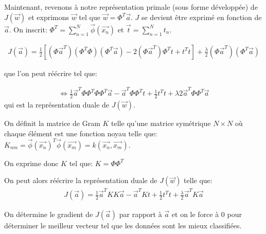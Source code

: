 Maintenant, revenons à notre représentation primale (sous forme développée) de $J(\overrightarrow{w})$ et exprimons $\overrightarrow{w}$ tel que $\overrightarrow{w} = \Phi^T \overrightarrow{a}$. 
$J$ se devient être exprimé en fonction de $\overrightarrow{a}$. On inscrit: $\Phi^T = \sum_{n=1}^N \overrightarrow{\phi}(\overrightarrow{x_n}) $ et $\overrightarrow{t} = \sum_{n=1}^Nt_n$.

\begin{equation}
\begin{split}
	J(\overrightarrow{a}) = \frac{1}{2} \left[(\Phi \overrightarrow{a}^T)(\Phi^T \Phi)(\Phi^T \overrightarrow{a}) - 2 (\Phi \overrightarrow{a}^T)\Phi^T t + t^T t \right] + \frac{\lambda}{2} (\Phi \overrightarrow{a}^T) (\Phi^T \overrightarrow{a})
\end{split}
\end{equation}

que l'on peut réécrire tel que:

\begin{equation}
\begin{split}
	\iff \frac{1}{2} \overrightarrow{a}^T \Phi \Phi^T \Phi \Phi^T \overrightarrow{a} - \overrightarrow{a}^T \Phi \Phi^T  t + \frac{1}{2} t^T t + {\lambda}{2} \overrightarrow{a}^T \Phi \Phi^T \overrightarrow{a}
\end{split}
\end{equation}
qui est la représentation duale de $J(\overrightarrow{w})$.

On définit la matrice de Gram $K$ telle qu'une matrice symétrique $N \times N$ où chaque élément est une fonction noyau telle que: $ K_{nm} = \overrightarrow{\phi} (\overrightarrow{x_n})^T \overrightarrow{\phi} (\overrightarrow{x_m}) = k(\overrightarrow{x_n}, \overrightarrow{x_m})$.

On exprime donc $K$ tel que: $K = \Phi \Phi^T$

On peut alors réécrire la représentation duale de $J(\overrightarrow{w})$ telle que:
\begin{equation}
\begin{split}
	J(\overrightarrow{a}) = \frac{1}{2} \overrightarrow{a}^T K K \overrightarrow{a} - \overrightarrow{a}^T K t + \frac{1}{2} t^T t + \frac{\lambda}{2} \overrightarrow{a}^T K \overrightarrow{a}
\end{split}
\end{equation}

On détermine le gradient de $J(\overrightarrow{a})$ par rapport à $\overrightarrow{a}$ et on le force à 0 pour déterminer le meilleur vecteur tel que les données sont les mieux classifiées.

